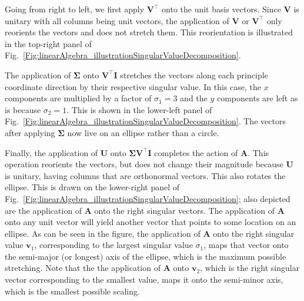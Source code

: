 Going from right to left, we first apply $\mathbf{V}^\top$ onto the unit basis vectors. Since $\mathbf{V}$ is unitary with all columns being unit vectors, the application of $\mathbf{V}$ or $\mathbf{V}^\top$ only reorients the vectors and does not stretch them. This reorientation is illustrated in the top-right panel of Fig.~\ref{Fig:linearAlgebra_illustrationSingularValueDecomposition}.

The application of $\boldsymbol\Sigma$ onto $\mathbf{V}^\top \mathbf{I}$ stretches the vectors along each principle coordinate direction by their respective singular value. In this case, the $x$ components are multiplied by a factor of $\sigma_1 = 3$ and the $y$ components are left as is because $\sigma_2 = 1$. This is shown in the lower-left panel of Fig.~\ref{Fig:linearAlgebra_illustrationSingularValueDecomposition}. The vectors after applying $\boldsymbol\Sigma$ now live on an ellipse rather than a circle.

Finally, the application of $\mathbf{U}$ onto $\boldsymbol\Sigma \mathbf{V}^\top \mathbf{I}$ completes the action of $\mathbf{A}$. This operation reorients the vectors, but does not change their magnitude because $\mathbf{U}$ is unitary, having columns that are orthonormal vectors. This also rotates the ellipse. This is drawn on the lower-right panel of Fig.~\ref{Fig:linearAlgebra_illustrationSingularValueDecomposition}; also depicted are the application of $\mathbf{A}$ onto the right singular vectors. The application of $\mathbf{A}$ onto any unit vector will yield another vector that points to some location on an ellipse. As can be seen in the figure, the application of $\mathbf{A}$ onto the right singular value $\mathbf{v}_1$, corresponding to the largest singular value $\sigma_1$, maps that vector onto the semi-major (or longest) axis of the ellipse, which is the maximum possible stretching. Note that the the application of $\mathbf{A}$ onto $\mathbf{v}_2$, which is the right singular vector corresponding to the smallest value, maps it onto the semi-minor axis, which is the smallest possible scaling.

